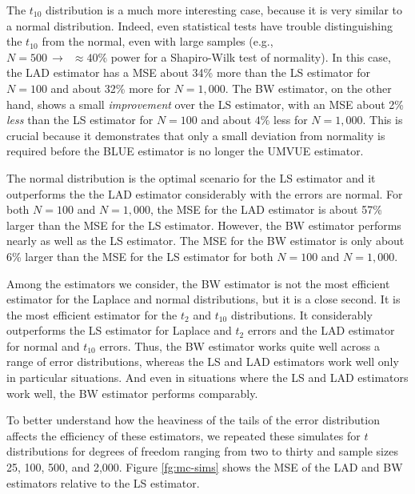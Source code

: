 \documentclass[12pt]{article}
\begin{document}
The $t_{10}$ distribution is a much more interesting case, because it is very similar to a normal distribution. 
Indeed, even statistical tests have trouble distinguishing the $t_{10}$ from the normal, even with large samples (e.g., $N = 500 \, \rightarrow \,\,\, \approx40\% \text{ power}$ for a Shapiro-Wilk test of normality). 
In this case, the LAD estimator has a MSE about 34\% more than the LS estimator for $N = 100$ and about 32\% more for $N = 1,000$. 
The BW estimator, on the other hand, shows a small \textit{improvement} over the LS estimator, with an MSE about 2\% \textit{less} than the LS estimator for $N = 100$ and about $4\%$ less for $N = 1,000$. 
This is crucial because it demonstrates that only a small deviation from normality is required before the BLUE estimator is no longer the UMVUE estimator. 

The normal distribution is the optimal scenario for the LS estimator and it outperforms the the LAD estimator considerably with the errors are normal. 
For both $N = 100$ and $N = 1,000$, the MSE for the LAD estimator is about 57\% larger than the MSE for the LS estimator. 
However, the BW estimator performs nearly as well as the LS estimator. 
The MSE for the BW estimator is only about 6\% larger than the MSE for the LS estimator for both $N = 100$ and $N = 1,000$.

Among the estimators we consider, the BW estimator is not the most efficient estimator for the Laplace and normal distributions, but it is a close second. 
It is the most efficient estimator for the $t_2$ and $t_{10}$ distributions. 
It considerably outperforms the LS estimator for Laplace and $t_2$ errors and the LAD estimator for normal and $t_{10}$ errors. 
Thus, the BW estimator works quite well across a range of error distributions, whereas the LS and LAD estimators work well only in particular situations. 
And even in situations where the LS and LAD estimators work well, the BW estimator performs comparably.

To better understand how the heaviness of the tails of the error distribution affects the efficiency of these estimators, we repeated these simulates for $t$ distributions for degrees of freedom ranging from two to thirty and sample sizes 25, 100, 500, and 2,000. Figure \ref{fg:mc-sims} shows the MSE of the LAD and BW estimators relative to the LS estimator.
\end{document}
